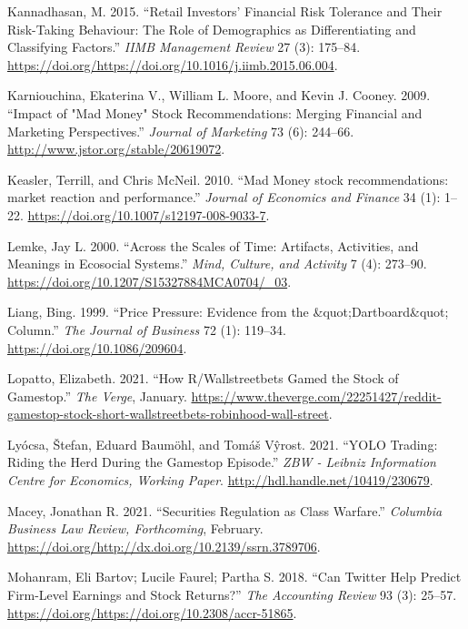 \documentclass[12pt,]{article}
\begin{document}
\leavevmode\hypertarget{ref-kannadhasan2015}{}%
Kannadhasan, M. 2015. ``Retail Investors' Financial Risk Tolerance and
Their Risk-Taking Behaviour: The Role of Demographics as Differentiating
and Classifying Factors.'' \emph{IIMB Management Review} 27 (3):
175--84.
\url{https://doi.org/https://doi.org/10.1016/j.iimb.2015.06.004}.

\leavevmode\hypertarget{ref-karniouchina2009}{}%
Karniouchina, Ekaterina V., William L. Moore, and Kevin J. Cooney. 2009.
``Impact of "Mad Money" Stock Recommendations: Merging Financial and
Marketing Perspectives.'' \emph{Journal of Marketing} 73 (6): 244--66.
\url{http://www.jstor.org/stable/20619072}.

\leavevmode\hypertarget{ref-keasler2010}{}%
Keasler, Terrill, and Chris McNeil. 2010. ``Mad Money stock
recommendations: market reaction and performance.'' \emph{Journal of
Economics and Finance} 34 (1): 1--22.
\url{https://doi.org/10.1007/s12197-008-9033-7}.

\leavevmode\hypertarget{ref-lemke}{}%
Lemke, Jay L. 2000. ``Across the Scales of Time: Artifacts, Activities,
and Meanings in Ecosocial Systems.'' \emph{Mind, Culture, and Activity}
7 (4): 273--90. \url{https://doi.org/10.1207/S15327884MCA0704/_03}.

\leavevmode\hypertarget{ref-liang1999}{}%
Liang, Bing. 1999. ``Price Pressure: Evidence from the
\&quot;Dartboard\&quot; Column.'' \emph{The Journal of Business} 72 (1):
119--34. \url{https://doi.org/10.1086/209604}.

\leavevmode\hypertarget{ref-lopatto2021}{}%
Lopatto, Elizabeth. 2021. ``How R/Wallstreetbets Gamed the Stock of
Gamestop.'' \emph{The Verge}, January.
\url{https://www.theverge.com/22251427/reddit-gamestop-stock-short-wallstreetbets-robinhood-wall-street}.

\leavevmode\hypertarget{ref-lyocsa2021}{}%
Lyócsa, Štefan, Eduard Baumöhl, and Tomáš Vŷrost. 2021. ``YOLO Trading:
Riding the Herd During the Gamestop Episode.'' \emph{ZBW - Leibniz
Information Centre for Economics, Working Paper}.
\url{http://hdl.handle.net/10419/230679}.

\leavevmode\hypertarget{ref-macey2021}{}%
Macey, Jonathan R. 2021. ``Securities Regulation as Class Warfare.''
\emph{Columbia Business Law Review, Forthcoming}, February.
\url{https://doi.org/http://dx.doi.org/10.2139/ssrn.3789706}.

\leavevmode\hypertarget{ref-bartov2018}{}%
Mohanram, Eli Bartov; Lucile Faurel; Partha S. 2018. ``Can Twitter Help
Predict Firm-Level Earnings and Stock Returns?'' \emph{The Accounting
Review} 93 (3): 25--57.
\url{https://doi.org/https://doi.org/10.2308/accr-51865}.
\end{document}
